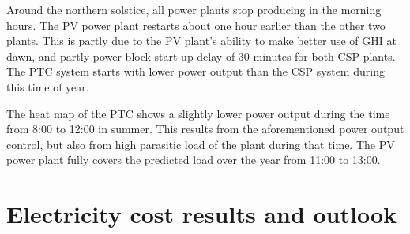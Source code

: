 
Around the northern solstice, all power plants stop producing in the morning hours. The PV power plant restarts about one hour earlier than the other two plants. This is partly due to the PV plant's ability to make better use of GHI at dawn, and partly power block start-up delay of 30 minutes for both CSP plants. The PTC system starts with lower power output than the CSP system during this time of year.


The heat map of the PTC shows a slightly lower power output during the time from 8:00 to 12:00 in summer. This results from the aforementioned power output control, but also from high parasitic load of the plant during that time. The PV power plant fully covers the predicted load over the year from 11:00 to 13:00.

\section{Electricity cost results and outlook}

